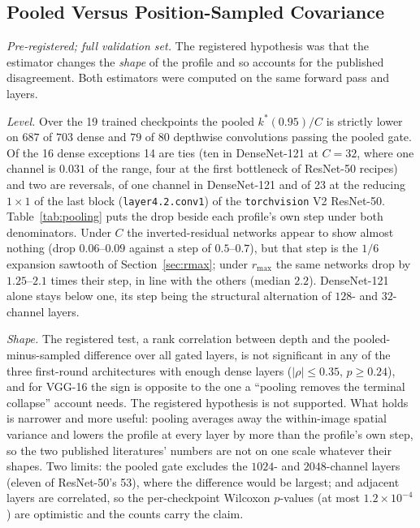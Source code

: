 \documentclass[10pt,journal,compsoc]{IEEEtran}
\begin{document}
\subsection{Pooled Versus Position-Sampled Covariance}
\label{sec:estimator}

\emph{Pre-registered; full validation set.} The registered hypothesis was
that the estimator changes the \emph{shape} of the profile and so accounts
for the published disagreement. Both estimators were computed on the same
forward pass and layers.

\emph{Level.} Over the 19 trained checkpoints the pooled $k^*(0.95)/C$ is
strictly lower on $687$ of $703$ dense and $79$ of $80$ depthwise
convolutions passing the pooled gate. Of the 16 dense exceptions 14 are
ties (ten in DenseNet-121 at $C = 32$, where one channel is $0.031$ of the
range, four at the first bottleneck of ResNet-50 recipes) and two are
reversals, of one channel in DenseNet-121 and of 23 at the reducing
$1\!\times\!1$ of the last block (\texttt{layer4.2.conv1}) of the
\texttt{torchvision} V2 ResNet-50. Table~\ref{tab:pooling} puts the drop
beside each profile's own step under both denominators. Under $C$ the
inverted-residual networks appear to show almost nothing (drop
$0.06$--$0.09$ against a step of $0.5$--$0.7$), but that step is the $1/6$
expansion sawtooth of Section~\ref{sec:rmax}; under $r_{\max}$ the same
networks drop by $1.25$--$2.1$ times their step, in line with the others
(median $2.2$). DenseNet-121 alone stays below one, its step being the
structural alternation of $128$- and $32$-channel layers.
\begin{table}[t]
  \centering
  \caption{Pooling lowers the level. Per trained checkpoint: dense
  convolutions passing the pooled gate on which the pooled $k^*(0.95)$ is
  strictly lower; the median drop and the profile's own adjacent-layer step,
  under $C$ and under $r_{\max}$; and their ratio.}
  \label{tab:pooling}
  \footnotesize
  
\end{table}

\emph{Shape.} The registered test, a rank correlation between depth and
the pooled-minus-sampled difference over all gated layers, is not
significant in any of the three first-round architectures with enough
dense layers ($|\rho| \le 0.35$, $p \ge 0.24$), and for VGG-16 the sign
is opposite to the one a ``pooling removes the terminal collapse''
account needs. The registered hypothesis is not supported. What holds is narrower
and more useful: pooling averages away the within-image spatial variance
and lowers the profile at every layer by more than the profile's own step,
so the two published literatures' numbers are not on one scale whatever
their shapes. Two limits: the pooled gate excludes the $1024$- and
$2048$-channel layers (eleven of ResNet-50's 53), where the difference
would be largest; and adjacent layers are correlated, so the per-checkpoint
Wilcoxon $p$-values (at most $1.2 \times 10^{-4}$) are optimistic and the
counts carry the claim.
\end{document}
